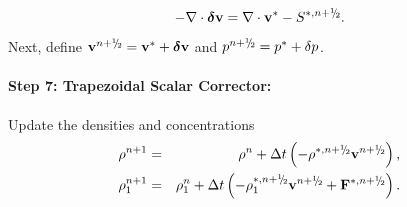 \documentclass[final]{siamltex}
\newcommand{\sfrac}[2]{\mathchoice
  {\kern0em\raise.5ex\hbox{\the\scriptfont0 #1}\kern-.15em/
   \kern-.15em\lower.25ex\hbox{\the\scriptfont0 #2}}
  {\kern0em\raise.5ex\hbox{\the\scriptfont0 #1}\kern-.15em/
   \kern-.15em\lower.25ex\hbox{\the\scriptfont0 #2}}
  {\kern0em\raise.5ex\hbox{\the\scriptscriptfont0 #1}\kern-.2em/
   \kern-.15em\lower.25ex\hbox{\the\scriptscriptfont0 #2}}
  {#1\!/#2}}
\def\Fb {{\bf F}}
\def\vb {{\bf v}}
\def\deltab {\boldsymbol{\delta}}
\def\myhalf {\sfrac{1}{2}}
\begin{document}
\begin{equation}
-\nabla\cdot\deltab\vb = \nabla\cdot\vb^* - S^{*,n+\myhalf}.
\end{equation}
Next, define $\vb^{n+\myhalf} = \vb^* + \deltab\vb$ and $p^{n+\myhalf} = p^* + \delta p$.\\ \\
{\bf Step 7: Trapezoidal Scalar Corrector:}\\ \\
Update the densities and concentrations
\begin{eqnarray}
\rho^{n+1} &=& \rho^n + \Delta t\left(-\rho^{*,n+\myhalf}\vb^{n+\myhalf}\right),\label{eq:alg2_2nd_rho_adv}\\
\rho_1^{n+1} &=& \rho_1^n + \Delta t\left(-\rho_1^{*,n+\myhalf}\vb^{n+\myhalf} + \Fb^{*,n+\myhalf}\right).\label{eq:alg2_2nd_rho1_adv}
\end{eqnarray}
\end{document}

